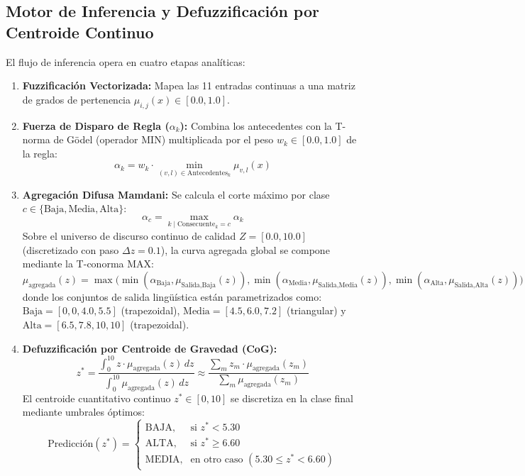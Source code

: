 \documentclass[11pt,a4paper]{article}
\begin{document}
\subsection{Motor de Inferencia y Defuzzificación por Centroide Continuo}
El flujo de inferencia opera en cuatro etapas analíticas:
\begin{enumerate}
    \item \textbf{Fuzzificación Vectorizada:} Mapea las 11 entradas continuas a una matriz de grados de pertenencia $\mu_{i,j}(x) \in [0.0, 1.0]$.
    \item \textbf{Fuerza de Disparo de Regla ($\alpha_k$):} Combina los antecedentes con la T-norma de Gödel (operador MIN) multiplicada por el peso $w_k \in [0.0, 1.0]$ de la regla:
    \begin{equation}
    \alpha_k = w_k \cdot \min_{(v, l) \in \text{Antecedentes}_k} \mu_{v, l}(x)
    \end{equation}
    \item \textbf{Agregación Difusa Mamdani:} Se calcula el corte máximo por clase $c \in \{\text{Baja}, \text{Media}, \text{Alta}\}$:
    \begin{equation}
    \alpha_c = \max_{k \mid \text{Consecuente}_k = c} \alpha_k
    \end{equation}
    Sobre el universo de discurso continuo de calidad $Z = [0.0, 10.0]$ (discretizado con paso $\Delta z = 0.1$), la curva agregada global se compone mediante la T-conorma MAX:
    \begin{equation}
    \mu_{\text{agregada}}(z) = \max \Big( \min(\alpha_{\text{Baja}}, \mu_{\text{Salida,Baja}}(z)), \min(\alpha_{\text{Media}}, \mu_{\text{Salida,Media}}(z)), \min(\alpha_{\text{Alta}}, \mu_{\text{Salida,Alta}}(z)) \Big)
    \end{equation}
    donde los conjuntos de salida lingüística están parametrizados como: $\text{Baja} = [0, 0, 4.0, 5.5]$ (trapezoidal), $\text{Media} = [4.5, 6.0, 7.2]$ (triangular) y $\text{Alta} = [6.5, 7.8, 10, 10]$ (trapezoidal).
    \item \textbf{Defuzzificación por Centroide de Gravedad (CoG):}
    \begin{equation}
    z^* = \frac{\int_{0}^{10} z \cdot \mu_{\text{agregada}}(z) \, dz}{\int_{0}^{10} \mu_{\text{agregada}}(z) \, dz} \approx \frac{\sum_m z_m \cdot \mu_{\text{agregada}}(z_m)}{\sum_m \mu_{\text{agregada}}(z_m)}
    \end{equation}
    El centroide cuantitativo continuo $z^* \in [0, 10]$ se discretiza en la clase final mediante umbrales óptimos:
    \begin{equation}
    \text{Predicción}(z^*) = \begin{cases}
    \text{BAJA}, & \text{si } z^* < 5.30 \\
    \text{ALTA}, & \text{si } z^* \ge 6.60 \\
    \text{MEDIA}, & \text{en otro caso } (5.30 \le z^* < 6.60)
    \end{cases}
    \end{equation}
\end{enumerate}
\end{document}
